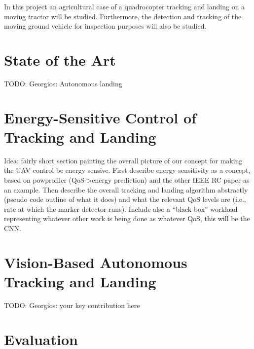 \documentclass[conference]{IEEEtran}
\begin{document}

In this project
an agricultural case of a quadrocopter tracking and landing on a moving tractor will be studied. Furthermore, the detection and tracking of the moving ground vehicle for inspection purposes will also be studied.

\section{State of the Art}
\label{sec:state-of-the-art}

TODO: Georgios: Autonomous landing

\section{Energy-Sensitive Control of Tracking and Landing}
\label{sec:approach}

Idea: fairly short section painting the overall picture of our concept
for making the UAV control be energy sensive. First describe energy
sensitivity as a concept, based on powprofiler (QoS->energy
prediction) and the other IEEE RC paper as an example. Then describe
the overall tracking and landing algorithm abstractly (pseudo code
outline of what it does) and what the relevant QoS levels are (i.e.,
rate at which the marker detector runs). Include also a ``black-box''
workload representing whatever other work is being done as whatever
QoS, this will be the CNN.

\section{Vision-Based Autonomous Tracking and Landing}
\label{sec:landing}

TODO: Georgios: your key contribution here

\section{Evaluation}
\label{sec:experimental}
\end{document}
